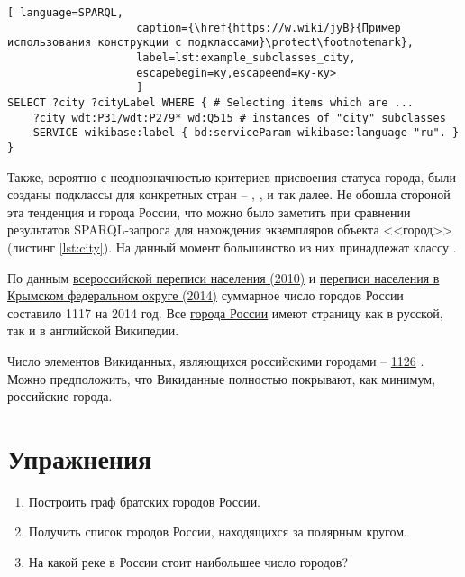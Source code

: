 \begin{lstlisting}[ language=SPARQL, 
                    caption={\href{https://w.wiki/jyB}{Пример использования конструкции с подклассами}\protect\footnotemark},
                    label=lst:example_subclasses_city, 
                    escapebegin=ку,escapeend=ку-ку>
                    ]
SELECT ?city ?cityLabel WHERE { # Selecting items which are ...
	?city wdt:P31/wdt:P279* wd:Q515 # instances of "city" subclasses
	SERVICE wikibase:label { bd:serviceParam wikibase:language "ru". }
}
\end{lstlisting}

Также, вероятно с неоднозначностью критериев присвоения статуса города, были созданы подклассы для конкретных стран -- , ,  и так далее. Не обошла стороной эта тенденция и города России, что можно было заметить при сравнении результатов SPARQL-запроса для нахождения экземпляров объекта <<город>> (листинг \ref{lst:city}). На данный момент большинство из них принадлежат классу .

По данным \href{http://www.gks.ru/free\_doc/new\_site/perepis2010/croc/Documents/Vol1/pub-01-03.pdf}{всероссийской переписи населения (2010)} и \href{https://rosstat.gov.ru/free\_doc/new\_site/population/demo/perepis\_krim/KRUM\_2015.pdf}{переписи населения в Крымском федеральном округе (2014)} суммарное число городов России составило \num{1117} на 2014 год. Все \href{https://bit.ly/32yqpw5}{города России} имеют страницу как в русской, так и в английской Википедии.

Число элементов Викиданных, являющихся российскими городами -- \href{https://w.wiki/jyP}{1126} . Можно предположить, что Викиданные полностью покрывают, как минимум, российские города. 

\section{Упражнения}
\begin{enumerate}
\item Построить граф братских городов России.
\item Получить список городов России, находящихся за полярным кругом.
\item На какой реке в России стоит наибольшее число городов?
\end{enumerate}
